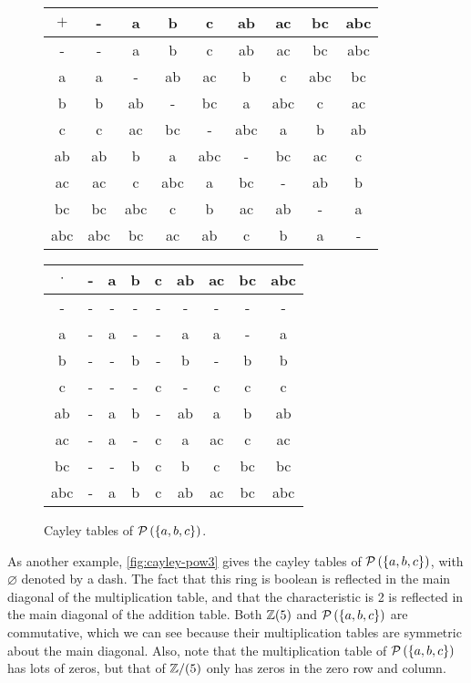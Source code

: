 \begin{figure}[h!]
\small
\begin{center}
\begin{tabular}{c|cccccccc}
\(+\) & -   & a   & b   & c   & ab  & ac  & bc  & abc \\ \hline
-     & -   & a   & b   & c   & ab  & ac  & bc  & abc \\
a     & a   & -   & ab  & ac  & b   & c   & abc & bc  \\
b     & b   & ab  & -   & bc  & a   & abc & c   & ac  \\
c     & c   & ac  & bc  & -   & abc & a   & b   & ab  \\
ab    & ab  & b   & a   & abc & -   & bc  & ac  & c   \\
ac    & ac  & c   & abc & a   & bc  & -   & ab  & b   \\
bc    & bc  & abc & c   & b   & ac  & ab  & -   & a   \\
abc   & abc & bc  & ac  & ab  & c   & b   & a   & -
\end{tabular}

\medskip\medskip

\begin{tabular}{c|cccccccc}
\(\cdot\) 
    & -   & a   & b   & c   & ab  & ac  & bc  & abc \\ \hline
-   & -   & -   & -   & -   & -   & -   & -   & -   \\
a   & -   & a   & -   & -   & a   & a   & -   & a   \\
b   & -   & -   & b   & -   & b   & -   & b   & b   \\
c   & -   & -   & -   & c   & -   & c   & c   & c   \\
ab  & -   & a   & b   & -   & ab  & a   & b   & ab  \\
ac  & -   & a   & -   & c   & a   & ac  & c   & ac  \\
bc  & -   & -   & b   & c   & b   & c   & bc  & bc  \\
abc & -   & a   & b   & c   & ab  & ac  & bc  & abc
\end{tabular}
\caption{\label{fig:cayley-pow3} Cayley tables of \(\mathcal{P}\left(\{a,b,c\}\right)\).}
\end{center}
\end{figure}
As another example, \autoref{fig:cayley-pow3} gives the cayley tables of \(\mathcal{P}\left(\{a,b,c\}\right)\), with \(\varnothing\) denoted by a dash.
The fact that this ring is boolean is reflected in the main diagonal of the multiplication table, and that the characteristic is 2 is reflected in the main diagonal of the addition table.
Both \(\mathbb{Z}(5)\) and \(\mathcal{P}\left(\{a,b,c\}\right)\) are commutative, which we can see because their multiplication tables are symmetric about the main diagonal.
Also, note that the multiplication table of \(\mathcal{P}\left(\{a,b,c\}\right)\) has lots of zeros, but that of \(\mathbb{Z}/(5)\) only has zeros in the zero row and column.

